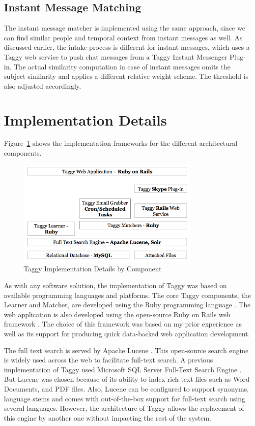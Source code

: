 \subsection{Instant Message Matching}
The instant message matcher is implemented using the same approach, since we can find similar people and temporal context from instant messages as well. As discussed earlier, the intake process is different for instant messages, which uses a Taggy web service to push chat messages from a Taggy Instant Messenger Plug-in. The actual similarity computation in case of instant messages omits the subject similarity and applies a different relative weight scheme. The threshold is also adjusted accordingly.

\section{Implementation Details}
Figure~\ref{fig:implementation} shows the implementation frameworks for the different architectural components.


\begin{figure}[!h]
	\centering
	\includegraphics[width=0.8\textwidth]{Implementation.png}
    \caption{Taggy Implementation Details by Component}
	\label{fig:implementation}
\end{figure}



As with any software solution, the implementation of Taggy was based on available programming languages and platforms. The core Taggy components, the Learner and Matcher, are developed using the Ruby programming language \cite{ruby}. The web application is also developed using the open-source Ruby on Rails web framework \cite{ruby_on_rails}. The choice of this framework was based on my prior experience as well as its support for producing quick data-backed web application development.

The full text search is served by Apache Lucene \cite{lucene}. This open-source search engine is widely used across the web to facilitate full-text search. A previous implementation of Taggy used Microsoft SQL Server Full-Text Search Engine \cite{auto_tagging, sql_server}. But Lucene was chosen because of its ability to index rich text files such as Word Documents, and PDF files. Also, Lucene can be configured to support synonyms, language stems and comes with out-of-the-box support for full-text search using several languages. However, the architecture of Taggy allows the replacement of this engine by another one without impacting the rest of the system.

